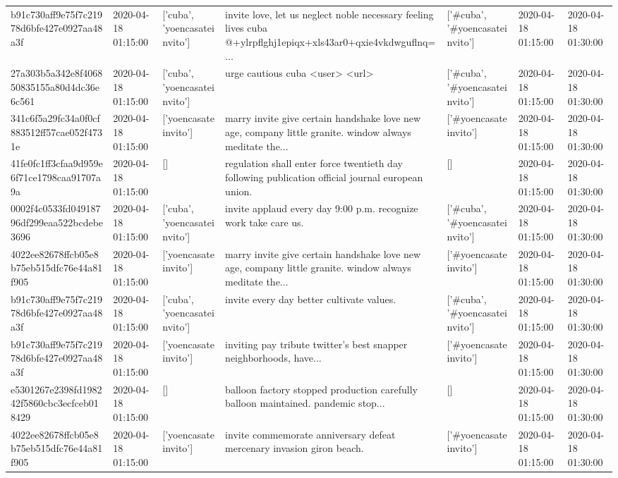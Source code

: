 \begin{tabular}{lllllll}
b91c730aff9e75f7c21978d6bfe427e0927aa48a3f & 2020-04-18 01:15:00 & ['cuba', 'yoencasateinvito'] & invite love, let us neglect noble necessary feeling lives cuba @+ylrpflghj1epiqx+xls43ar0+qxie4vkdwguflnq=... & ['#cuba', '#yoencasateinvito'] & 2020-04-18 01:15:00 & 2020-04-18 01:30:00 \\
27a303b5a342e8f406850835155a80d4dc36e6c561 & 2020-04-18 01:15:00 & ['cuba', 'yoencasateinvito'] & urge cautious cuba <user> <url> & ['#cuba', '#yoencasateinvito'] & 2020-04-18 01:15:00 & 2020-04-18 01:30:00 \\
341c6f5a29fc34a0f0cf883512ff57cae052f4731e & 2020-04-18 01:15:00 & ['yoencasateinvito'] & marry invite give certain handshake love new age, company little granite. window always meditate the... & ['#yoencasateinvito'] & 2020-04-18 01:15:00 & 2020-04-18 01:30:00 \\
41fe0fc1ff3cfaa9d959e6f71ce1798caa91707a9a & 2020-04-18 01:15:00 & [] & regulation shall enter force twentieth day following publication official journal european union. & [] & 2020-04-18 01:15:00 & 2020-04-18 01:30:00 \\
0002f4c0533fd04918796df299eaa522bcdebe3696 & 2020-04-18 01:15:00 & ['cuba', 'yoencasateinvito'] & invite applaud every day 9:00 p.m. recognize work take care us. & ['#cuba', '#yoencasateinvito'] & 2020-04-18 01:15:00 & 2020-04-18 01:30:00 \\
4022ee82678ffcb05e8b75eb515dfc76e44a81f905 & 2020-04-18 01:15:00 & ['yoencasateinvito'] & marry invite give certain handshake love new age, company little granite. window always meditate the... & ['#yoencasateinvito'] & 2020-04-18 01:15:00 & 2020-04-18 01:30:00 \\
b91c730aff9e75f7c21978d6bfe427e0927aa48a3f & 2020-04-18 01:15:00 & ['cuba', 'yoencasateinvito'] & invite every day better cultivate values. & ['#cuba', '#yoencasateinvito'] & 2020-04-18 01:15:00 & 2020-04-18 01:30:00 \\
b91c730aff9e75f7c21978d6bfe427e0927aa48a3f & 2020-04-18 01:15:00 & ['yoencasateinvito'] & inviting pay tribute twitter's best snapper neighborhoods, have... & ['#yoencasateinvito'] & 2020-04-18 01:15:00 & 2020-04-18 01:30:00 \\
e5301267e2398fd198242f5860cbc3ecfceb018429 & 2020-04-18 01:15:00 & [] & balloon factory stopped production carefully balloon maintained. pandemic stop... & [] & 2020-04-18 01:15:00 & 2020-04-18 01:30:00 \\
4022ee82678ffcb05e8b75eb515dfc76e44a81f905 & 2020-04-18 01:15:00 & ['yoencasateinvito'] & invite commemorate anniversary defeat mercenary invasion giron beach. & ['#yoencasateinvito'] & 2020-04-18 01:15:00 & 2020-04-18 01:30:00 \\

\end{tabular}
